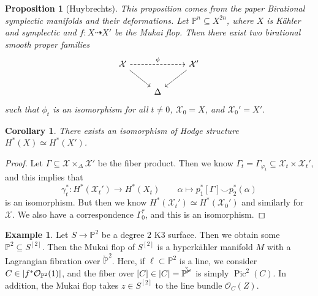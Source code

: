\documentclass[leqno, openany]{memoir}
\newtheorem{cor}[thm]{Corollary}
\newtheorem{prop}[thm]{Proposition}
\theoremstyle{definition}
\newtheorem{exm}[thm]{Example}
\theoremstyle{remark}
\theoremstyle{plain}
\theoremstyle{definition}
\theoremstyle{remark}
\renewcommand{\P}{\mathbb{P}}
\newcommand{\mc}[1]{\mathcal{#1}}
\DeclareMathOperator{\Pic}{Pic}
\begin{document}
\begin{prop}[Huybrechts]\label{prop:biratdefs}
    This proposition comes from the paper \textit{Birational symplectic manifolds and their deformations}. Let $\P^n \subseteq X^{2n}$, where $X$ is K\"ahler and symplectic and $f \colon X \dashrightarrow X'$ be the Mukai flop. Then there exist two birational smooth proper families
    \begin{equation*}
    \begin{tikzcd}
        \mc{X} \ar[dashrightarrow]{rr}{\phi} \ar{dr} & & \mc{X}' \ar{dl} \\
        & \Delta
    \end{tikzcd}
    \end{equation*}
    such that $\phi_t$ is an isomorphism for all $t \neq 0$, $\mc{X}_0 = X$, and $\mc{X}_0' = X'$.
\end{prop}

\begin{cor}
    There exists an isomorphism of Hodge structure $H^*(X) \simeq H^*(X')$.
\end{cor}

\begin{proof}
    Let $\Gamma \subseteq \mc{X} \times_{\Delta} \mc{X}'$ be the fiber product. Then we know $\Gamma_t = \Gamma_{\varphi_t} \subseteq \mc{X}_t \times \mc{X}_t'$, and this implies that
    \[ \gamma_t^* \colon H^*(\mc{X}_t') \to H^*(X_t) \qquad \alpha \mapsto p_1^* [\Gamma] \smile p_2^*(\alpha) \]
    is an isomorphism. But then we know $H^*(\mc{X}_t') \simeq H^*(\mc{X}_0')$ and similarly for $\mc{X}$. We also have a correspondence $\Gamma_0^*$, and this is an isomorphism.
\end{proof}

\begin{exm}
    Let $S \to \P^2$ be a degree $2$ K3 surface. Then we obtain some $\P^2 \subseteq S^{[2]}$. Then the Mukai flop of $S^{[2]}$ is a hyperk\"ahler manifold $M$ with a Lagrangian fibration over $\check{\P}^2$. Here, if $\ell \subset \P^2$ is a line, we consider $C \in \abs{f^* \mc{O}_{\P^2}(1)}$, and the fiber over $[C] \in\abs{C} = \check{\P^2}$ is simply $\Pic^2(C)$. In addition, the Mukai flop takes $z \in S^{[2]}$ to the line bundle $\mc{O}_C(Z)$.
\end{exm}
\end{document}

